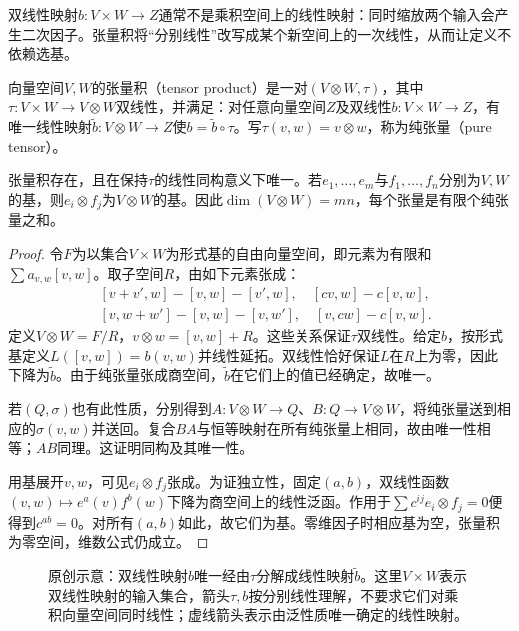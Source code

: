 双线性映射$b:V\times W\to Z$通常不是乘积空间上的线性映射：同时缩放两个输入会产生二次因子。张量积将“分别线性”改写成某个新空间上的一次线性，从而让定义不依赖选基。
\begin{definition}[张量积的泛性质]
向量空间$V,W$的张量积（tensor product）是一对$(V\otimes W,\tau)$，其中$\tau:V\times W\to V\otimes W$双线性，并满足：对任意向量空间$Z$及双线性$b:V\times W\to Z$，有唯一线性映射$\widetilde b:V\otimes W\to Z$使$b=\widetilde b\circ\tau$。写$\tau(v,w)=v\otimes w$，称为纯张量（pure tensor）。
\end{definition}
\begin{theorem}\label{thm:tensor-universal}
张量积存在，且在保持$\tau$的线性同构意义下唯一。若$e_1,\ldots,e_m$与$f_1,\ldots,f_n$分别为$V,W$的基，则$e_i\otimes f_j$为$V\otimes W$的基。因此$\dim(V\otimes W)=mn$，每个张量是有限个纯张量之和。
\end{theorem}
\begin{proof}
令$F$为以集合$V\times W$为形式基的自由向量空间，即元素为有限和$\sum a_{v,w}[v,w]$。取子空间$R$，由如下元素张成：
\begin{align*}
 &[v+v',w]-[v,w]-[v',w],\quad [cv,w]-c[v,w],\\
 &[v,w+w']-[v,w]-[v,w'],\quad [v,cw]-c[v,w].
\end{align*}
定义$V\otimes W=F/R$，$v\otimes w=[v,w]+R$。这些关系保证$\tau$双线性。给定$b$，按形式基定义$L([v,w])=b(v,w)$并线性延拓。双线性恰好保证$L$在$R$上为零，因此下降为$\widetilde b$。由于纯张量张成商空间，$\widetilde b$在它们上的值已经确定，故唯一。

若$(Q,\sigma)$也有此性质，分别得到$A:V\otimes W\to Q$、$B:Q\to V\otimes W$，将纯张量送到相应的$\sigma(v,w)$并送回。复合$BA$与恒等映射在所有纯张量上相同，故由唯一性相等；$AB$同理。这证明同构及其唯一性。

用基展开$v,w$，可见$e_i\otimes f_j$张成。为证独立性，固定$(a,b)$，双线性函数$(v,w)\mapsto e^a(v)f^b(w)$下降为商空间上的线性泛函。作用于$\sum c^{ij}e_i\otimes f_j=0$便得到$c^{ab}=0$。对所有$(a,b)$如此，故它们为基。零维因子时相应基为空，张量积为零空间，维数公式仍成立。
\end{proof}
\begin{figure}[htbp]
\centering
\caption{原创示意：双线性映射$b$唯一经由$\tau$分解成线性映射$\widetilde b$。这里$V\times W$表示双线性映射的输入集合，箭头$\tau,b$按分别线性理解，不要求它们对乘积向量空间同时线性；虚线箭头表示由泛性质唯一确定的线性映射。}
\label{fig:tensor-universal}
\end{figure}
